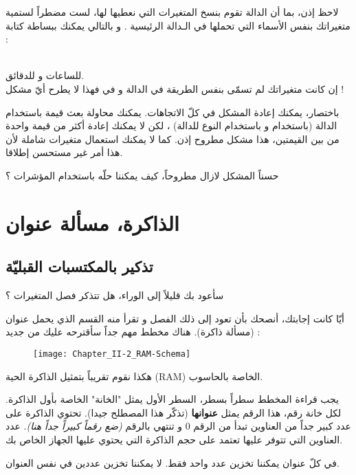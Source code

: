 \begin{information}
	لاحظ إذن، بما أن الدالة تقوم بنسخ المتغيرات التي نعطيها لها، لست مضطراً لستمية متغيراتك بنفس الأسماء التي تحملها في الـدالة الرئيسية
.
و بالتالي يمكنك ببساطة كتابة :

\\
للساعات و
للدقائق.\\
إن كانت متغيراتك لم تسمّى بنفس الطريقة في الدالة و في
فهذا لا يطرح أيّ مشكل !
\end{information}


باختصار، يمكنك إعادة المشكل في كلّ الاتجاهات. يمكنك محاولة بعث قيمة باستخدام الدالة (باستخدام
و باستخدام النوع
للدالة) ، لكن لا يمكنك إعادة أكثر من قيمة واحدة من بين القيمتين، هذا مشكل مطروح إذن. كما لا يمكنك استعمال متغيرات شاملة لأن هذا أمر غير مستحسن إطلاقا.

حسناً المشكل لازال مطروحاً، كيف يمكننا حلّه باستخدام المؤشرات ؟

\section{الذاكرة، مسألة عنوان}

\subsection{تذكير بالمكتسبات القبليّة}

سأعود بك قليلاً إلى الوراء، هل تتذكر فصل المتغيرات ؟

أيّا كانت إجابتك، أنصحك بأن تعود إلى ذلك الفصل و تقرأ منه القسم الذي يحمل عنوان (مسألة ذاكرة). هناك مخطط مهم جداً سأقترحه عليك من جديد :

\begin{figure}[H]
	\centering
	\texttt{[image: Chapter\_II-2\_RAM-Schema]}
\end{figure}


هكذا نقوم تقريباً بتمثيل الذاكرة الحية
(\textenglish{RAM})
الخاصة بالحاسوب.

يجب قراءة المخطط سطراً بسطر، السطر الأول يمثل "الخانة" الخاصة بأول الذاكرة. لكل خانة رقم، هذا الرقم يمثل
\textbf{عنوانها}
(تذكّر هذا المصطلح جيدا). تحتوي الذاكرة على عدد كبير جداً من العناوين تبدأ من الرقم 0 و تنتهي بالرقم
\textit{(ضع رقماً كبيراً جداً هنا)}.
عدد العناوين التي تتوفر عليها تعتمد على حجم الذاكرة التي يحتوي عليها الجهاز الخاص بك.

في كلّ عنوان يمكننا تخزين عدد واحد فقط. لا يمكننا تخزين عددين في نفس العنوان.


